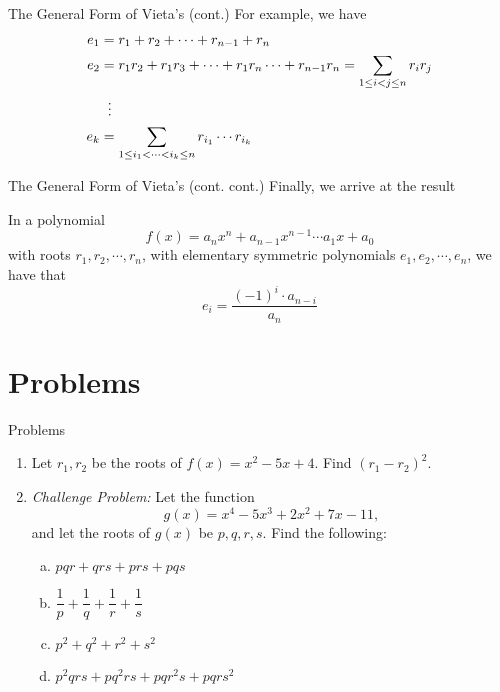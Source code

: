 \documentclass[aspectratio=169,xcolor=dvipsnames]{beamer}
\begin{document}
\begin{frame}{The General Form of Vieta's (cont.)}
    For example, we have
    \[
        \begin{aligned}
        e_1 &= r_1+r_2+\cdots+r_{n-1}+r_n\\
        e_2 &=r_1r_2+r_1r_3+\cdots +r_1r_n\cdots +r_{n-1}r_n= \sum_{1\le i<j\le n} r_i r_j\\
        &\hspace{0.2cm} \vdots\\
        e_k &= \sum_{1\le i_1<\cdots<i_k\le n} r_{i_1}\cdots r_{i_k}
        \end{aligned}
        \]
\end{frame}
\begin{frame}{The General Form of Vieta's (cont. cont.)}
    Finally, we arrive at the result
    \begin{theorem}
        In a polynomial \[f(x)=a_nx^n+a_{n-1}x^{n-1}\cdots a_1x+a_0\] with roots $r_1,r_2,\cdots,r_n$, with elementary symmetric polynomials $e_1,e_2,\cdots,e_n$, we have that
        \[e_i=\frac{(-1)^i\cdot a_{n-i}}{a_n}\]
    \end{theorem}
\end{frame}
\section{Problems}
\begin{frame}{Problems}
    \begin{enumerate}
        \item Let \(r_1, r_2\) be the roots of \(f(x)=x^2-5x+4\). Find \((r_1-r_2)^2\).
        \item \textit{Challenge Problem: } Let the function 
        \[g(x) = x^4 - 5x^3 + 2x^2 +7x - 11,\] and let the roots of $g(x)$ be $p,q,r,s$. Find the following: \\
        \begin{enumerate}[a)]
            \item $pqr+qrs+prs+pqs$
            \item $\dfrac{1}{p}+\dfrac{1}{q}+\dfrac{1}{r}+\dfrac{1}{s}$
            \item $p^2 +q^2 + r^2 + s^2$
            \item $p^2qrs + pq^2rs + pqr^2s + pqrs^2$
        \end{enumerate} 
    \end{enumerate}
\end{frame}
\end{document}
